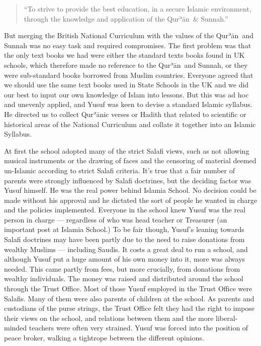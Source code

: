 \documentclass[12pt]{memoir}
\def\´{ʾ} %
\def \Quran{Qur\-\´ān} %
\def\–{-\hskip0pt}
\begin{document}
\begin{quote}
“To strive to provide the best education, in a secure Islamic environment,
through the knowledge and application of the \Quran\ \& Sunnah.”
\end{quote}

But merging the British National Curriculum with the values of
the \Quran\ and Sunnah was no easy task and required compromises.
The first problem was that the only text books we had were either
the standard texts books found in UK schools,
which therefore made no reference to the \Quran\ and Sunnah,
or they were sub\–standard books borrowed from Muslim countries.
Everyone agreed that we should use the same text books
used in State Schools in the UK and we did our best
to input our own knowledge of Islam into lessons.
But this was ad hoc and unevenly applied,
and Yusuf was keen to devise a standard Islamic syllabus.
He directed us to collect \Quran{}ic verses or Hadith
that related to scientific or historical areas of the National Curriculum
and collate it together into an Islamic Syllabus.

At first the school adopted many of the strict Salafi views,
such as not allowing musical instruments or the drawing of faces
and the censoring of material deemed un-Islamic
according to strict Salafi criteria.
It’s true that a fair number of parents were strongly influenced
by Salafi doctrines, but the deciding factor was Yusuf himself.
He was the real power behind Islamia School.
No decision could be made without his approval and he dictated
the sort of people he wanted in charge and the policies implemented.
Everyone in the school knew Yusuf was the real person in charge —
regardless of who was head teacher or Treasurer
(an important post at Islamia School.)
To be fair though, Yusuf’s leaning towards Salafi doctrines
may have been partly due to the need
to raise donations from wealthy Muslims — including Saudis.
It costs a great deal to run a school,
and although Yusuf put a huge amount of his own money into it,
more was always needed.
This came partly from fees, but more crucially,
from donations from wealthy individuals.
The money was raised and distributed around the school
through the Trust Office.
Most of those Yusuf employed in the Trust Office were Salafis.
Many of them were also parents of children at the school.
As parents and custodians of the purse strings,
the Trust Office felt they had the right to impose their views on the school,
and relations between them and the more liberal-minded teachers
were often very strained.
Yusuf was forced into the position of peace broker,
walking a tightrope between the different opinions.
\end{document}
